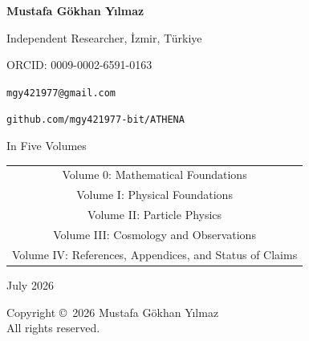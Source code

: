 \documentclass[12pt,oneside]{book}
\begin{document}
\begin{titlepage}
\vspace{1cm}

{\Large \textbf{Mustafa Gökhan Yılmaz}}

\vspace{0.3cm}

{\large Independent Researcher, İzmir, Türkiye}

\vspace{0.2cm}

{\large ORCID: 0009-0002-6591-0163}

\vspace{0.2cm}

{\large \texttt{mgy421977@gmail.com}}

\vspace{0.2cm}

{\large \texttt{github.com/mgy421977-bit/ATHENA}}

\vspace{2cm}

{\large In Five Volumes}

\vspace{0.3cm}
\begin{tabular}{c}
Volume 0: Mathematical Foundations \\
Volume I: Physical Foundations \\
Volume II: Particle Physics \\
Volume III: Cosmology and Observations \\
Volume IV: References, Appendices, and Status of Claims
\end{tabular}

\vspace{2cm}

{\large July 2026}

\vfill

\end{titlepage}


\newpage
\thispagestyle{empty}
\vspace*{\fill}
\begin{center}
Copyright \copyright\ 2026 Mustafa Gökhan Yılmaz\\
All rights reserved.
\end{center}
\vspace*{\fill}

\end{document}
